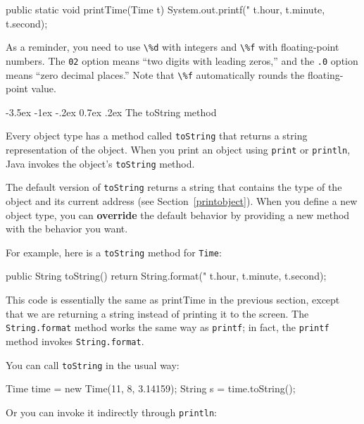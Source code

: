 \documentclass[12pt]{book}
\makeatletter
\renewcommand{\section}{\@startsection {section}{1}{\z@}%
    {-3.5ex \@plus -1ex \@minus -.2ex}%
    {0.7ex \@plus.2ex}%
    {\normalfont\Large\bfseries}}
\theoremstyle{exercise}
\newcommand{\java}[1]{\lstinline{#1}} %
\makeatother
\begin{document}
\begin{code}
    public static void printTime(Time t) {
        System.out.printf("%
            t.hour, t.minute, t.second);
    }
\end{code}

As a reminder, you need to use \java{\%d} with integers and \java{\%f} with floating-point numbers.
The \java{02} option means ``two digits with leading zeros,'' and the \java{.0} option means ``zero decimal places.''
Note that \java{\%f} automatically rounds the floating-point value.


\section{The toString method}


Every object type has a method called \java{toString} that returns a string representation of the object.
When you print an object using \java{print} or \java{println}, Java invokes the object's \java{toString} method.


The default version of \java{toString} returns a string that contains the type of the object and its current address (see Section~\ref{printobject}).
When you define a new object type, you can {\bf override} the default behavior by providing a new method with the behavior you want.

For example, here is a \java{toString} method for \java{Time}:

\begin{code}
public String toString() {
    return String.format("%
            t.hour, t.minute, t.second);
}
\end{code}

This code is essentially the same as printTime in the previous section, except that we are returning a string instead of printing it to the screen.
The \java{String.format} method works the same way as \java{printf}; in fact, the \java{printf} method invokes \java{String.format}.

You can call \java{toString} in the usual way:

\begin{code}
    Time time = new Time(11, 8, 3.14159);
    String s = time.toString();
\end{code}

Or you can invoke it indirectly through \java{println}:
\end{document}

